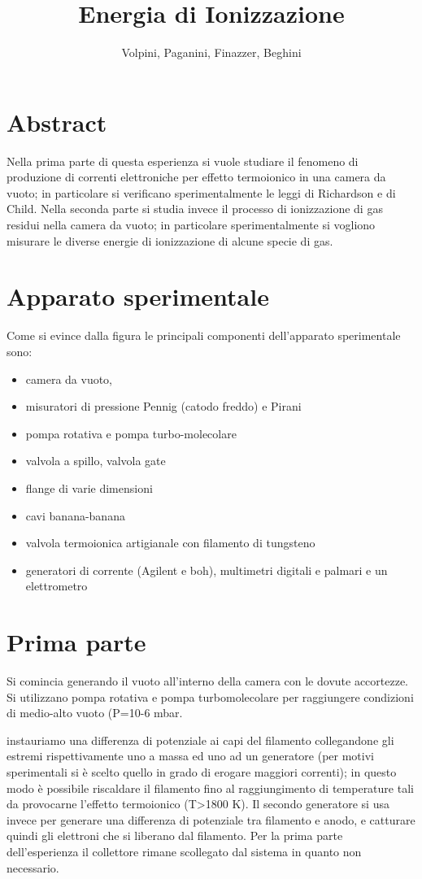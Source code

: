 \documentclass[11pt,a4paper]{article}
\author{Volpini, Paganini, Finazzer, Beghini}
\title{Energia di Ionizzazione }
\begin{document}
\maketitle 
\section{Abstract}
Nella prima parte di questa esperienza si vuole studiare il fenomeno di produzione di correnti elettroniche per effetto termoionico in una camera da vuoto; in particolare si verificano sperimentalmente le leggi di Richardson e di Child. Nella seconda parte si studia invece il processo di ionizzazione di gas residui nella camera da vuoto; in particolare sperimentalmente si vogliono misurare le diverse energie di ionizzazione di alcune specie di gas.  
\section{Apparato sperimentale}
Come si evince dalla figura le principali componenti dell'apparato sperimentale sono:
\begin{itemize}
\item camera da vuoto, 
\item misuratori di pressione Pennig (catodo freddo) e Pirani
\item pompa rotativa e pompa turbo-molecolare
\item valvola a spillo, valvola gate
\item flange di varie dimensioni
\item cavi banana-banana
\item valvola termoionica artigianale con filamento di tungsteno
\item generatori di corrente (Agilent e boh), multimetri digitali e palmari e un elettrometro
\end{itemize} 


\section{Prima parte}
Si comincia generando il vuoto all'interno della camera con le dovute accortezze. Si utilizzano pompa rotativa e pompa turbomolecolare per raggiungere condizioni di medio-alto vuoto ({P=10-6 mbar}.

instauriamo una differenza di potenziale ai capi del filamento collegandone gli estremi rispettivamente uno a massa ed uno ad un generatore (per motivi sperimentali si è scelto quello in grado di erogare maggiori correnti); in questo modo è possibile riscaldare il filamento fino al raggiungimento di temperature tali da provocarne l'effetto termoionico ({T>1800 K}). Il secondo generatore si usa invece per generare una differenza di potenziale tra filamento e anodo, e catturare quindi gli elettroni che si liberano dal filamento. Per la prima parte dell'esperienza il collettore rimane scollegato dal sistema in quanto non necessario.
\end{document}
